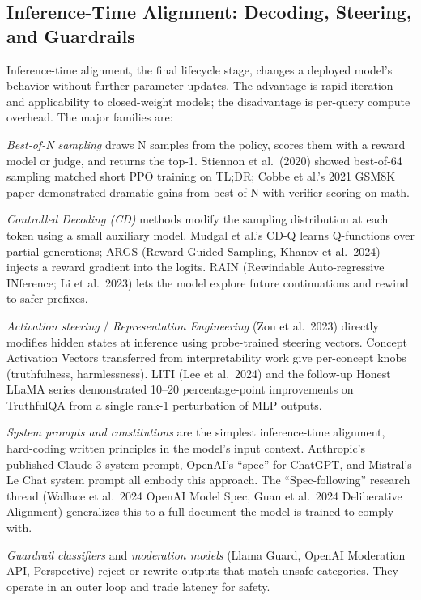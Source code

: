 \subsection{Inference-Time Alignment: Decoding, Steering, and Guardrails}\label{inference-time-alignment-decoding-steering-and-guardrails}

Inference-time alignment, the final lifecycle stage, changes a deployed model's behavior without further parameter updates. The advantage is rapid iteration and applicability to closed-weight models; the disadvantage is per-query compute overhead. The major families are:

\emph{Best-of-N sampling} draws N samples from the policy, scores them with a reward model or judge, and returns the top-1. Stiennon et al.~(2020) showed best-of-64 sampling matched short PPO training on TL;DR; Cobbe et al.'s 2021 GSM8K paper demonstrated dramatic gains from best-of-N with verifier scoring on math.

\emph{Controlled Decoding (CD)} methods modify the sampling distribution at each token using a small auxiliary model. Mudgal et al.'s CD-Q learns Q-functions over partial generations; ARGS (Reward-Guided Sampling, Khanov et al.~2024) injects a reward gradient into the logits. RAIN (Rewindable Auto-regressive INference; Li et al.~2023) lets the model explore future continuations and rewind to safer prefixes.

\emph{Activation steering} / \emph{Representation Engineering} (Zou et al.~2023) directly modifies hidden states at inference using probe-trained steering vectors. Concept Activation Vectors transferred from interpretability work give per-concept knobs (truthfulness, harmlessness). LITI (Lee et al.~2024) and the follow-up Honest LLaMA series demonstrated 10--20 percentage-point improvements on TruthfulQA from a single rank-1 perturbation of MLP outputs.

\emph{System prompts and constitutions} are the simplest inference-time alignment, hard-coding written principles in the model's input context. Anthropic's published Claude 3 system prompt, OpenAI's ``spec'' for ChatGPT, and Mistral's Le Chat system prompt all embody this approach. The ``Spec-following'' research thread (Wallace et al.~2024 OpenAI Model Spec, Guan et al.~2024 Deliberative Alignment) generalizes this to a full document the model is trained to comply with.

\emph{Guardrail classifiers} and \emph{moderation models} (Llama Guard, OpenAI Moderation API, Perspective) reject or rewrite outputs that match unsafe categories. They operate in an outer loop and trade latency for safety.

